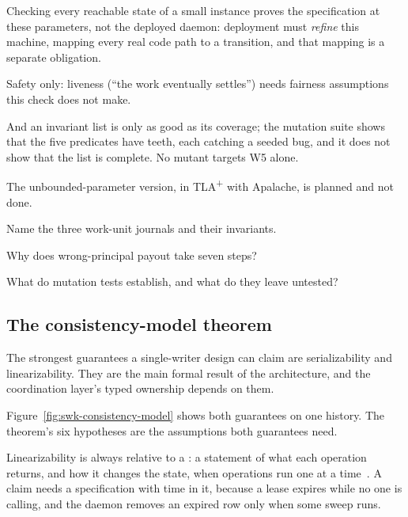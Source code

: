 \documentclass[11pt,a4paper]{article}
\theoremstyle{definition}
\theoremstyle{remark}
\begin{document}
\begin{pdboundary}
\setlength{\parskip}{4pt plus 1pt}
Checking every reachable state of a small instance proves the specification at these parameters,
not the deployed daemon: deployment must \emph{refine} this machine, mapping every real code
path to a transition, and that mapping is a separate obligation.

Safety only: liveness
(``the work eventually settles'') needs fairness assumptions this check does not make.

And
an invariant list is only as good as its coverage; the mutation suite shows that the five
predicates have teeth, each catching a seeded bug, and it does not show that the list is
complete. No mutant targets W5 alone.

The unbounded-parameter version, in TLA\textsuperscript{+}
with Apalache, is planned and not done.
\end{pdboundary}

\pdexercisepointer*{\ref{ex:swk-crimes}}{\ref{ex:swk-seventh-invariant}}{\pageref{ex:swk-crimes}}
\begin{pdrecitation}
\item Name the three work-unit journals and their invariants.
\item Why does wrong-principal payout take seven steps?
\item What do mutation tests establish, and what do they leave untested?
\end{pdrecitation}


\subsection{The consistency-model theorem}

The strongest guarantees a single-writer design can claim are serializability
and linearizability. They are the main formal result of the architecture, and
the coordination layer's typed ownership depends on them.

Figure~\ref{fig:swk-consistency-model} shows both guarantees on one history. The
theorem's six hypotheses are the assumptions both guarantees need.



Linearizability is always relative to a :
a statement of what each operation returns, and how it changes the state, when
operations run one at a time~. A claim needs a
specification with time in it, because a lease expires while no one is calling,
and the daemon removes an expired row only when some sweep runs.
\end{document}
